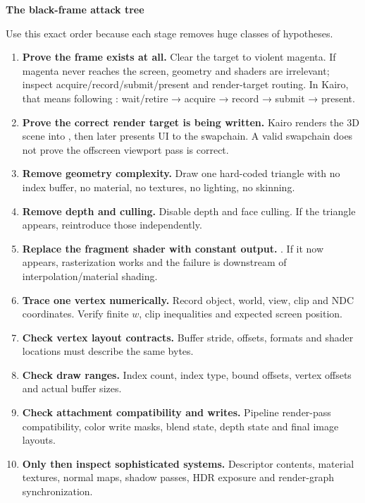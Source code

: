 \textbf{The black-frame attack tree}

Use this exact order because each stage removes huge classes of hypotheses.

\begin{enumerate}
\def\labelenumi{\arabic{enumi}.}
\item
  \textbf{Prove the frame exists at all.} Clear the target to violent magenta. If magenta never reaches the screen, geometry and shaders are irrelevant; inspect acquire/record/submit/present and render-target routing. In Kairo, that means following : wait/retire → acquire → record → submit → present.
\item
  \textbf{Prove the correct render target is being written.} Kairo renders the 3D scene into , then later presents UI to the swapchain. A valid swapchain does not prove the offscreen viewport pass is correct.
\item
  \textbf{Remove geometry complexity.} Draw one hard-coded triangle with no index buffer, no material, no textures, no lighting, no skinning.
\item
  \textbf{Remove depth and culling.} Disable depth and face culling. If the triangle appears, reintroduce those independently.
\item
  \textbf{Replace the fragment shader with constant output.} . If it now appears, rasterization works and the failure is downstream of interpolation/material shading.
\item
  \textbf{Trace one vertex numerically.} Record object, world, view, clip and NDC coordinates. Verify finite \(w\), clip inequalities and expected screen position.
\item
  \textbf{Check vertex layout contracts.} Buffer stride, offsets, formats and shader locations must describe the same bytes.
\item
  \textbf{Check draw ranges.} Index count, index type, bound offsets, vertex offsets and actual buffer sizes.
\item
  \textbf{Check attachment compatibility and writes.} Pipeline render-pass compatibility, color write masks, blend state, depth state and final image layouts.
\item
  \textbf{Only then inspect sophisticated systems.} Descriptor contents, material textures, normal maps, shadow passes, HDR exposure and render-graph synchronization.
\end{enumerate}

